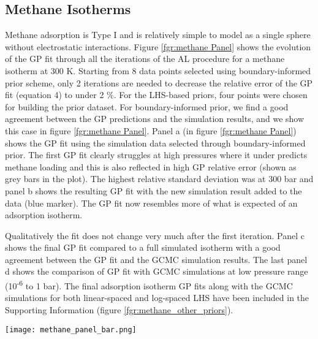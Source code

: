 \documentclass[twoside,twocolumn,9pt]{article}
\begin{document}
\subsection{Methane Isotherms}
Methane adsorption is Type I and is relatively simple to model as a single sphere without electrostatic interactions. Figure \ref{fgr:methane Panel} shows the evolution of the GP fit through all the iterations of the AL procedure for a methane isotherm at 300 K. Starting from 8 data points selected using boundary-informed prior scheme, only 2 iterations are needed to decrease the relative error of the GP fit (equation 4) to under 2 \%. For the LHS-based priors, four points were chosen for building the prior dataset. For boundary-informed prior, we find a good agreement between the GP predictions and the simulation results, and we show this case in figure \ref{fgr:methane Panel}. Panel a (in figure \ref{fgr:methane Panel}) shows the GP fit using the simulation data selected through boundary-informed prior. The first GP fit clearly struggles at high pressures where it under predicts methane loading and this is also reflected in high GP relative error (shown as grey bars in the plot). The highest relative standard deviation was at 300 bar and panel b shows the resulting GP fit with the new simulation result added to the data (blue marker). The GP fit now resembles more of what is expected of an adsorption isotherm.

Qualitatively the fit does not change very much after the first iteration. Panel c shows the final GP fit compared to a full simulated isotherm with a good agreement between the GP fit and the GCMC simulation results. The last panel d shows the comparison of GP fit with GCMC simulations at low pressure range (10\textsuperscript{-6} to 1 bar). The final adsorption isotherm GP fits along with the GCMC simulations for both linear-spaced and log-spaced LHS have been included in the Supporting Information (figure \ref{fgr:methane_other_priors}). 

\begin{figure*}
\centering
  \texttt{[image: methane\_panel\_bar.png]}
  \caption{Evolution of GP fit to GCMC simulations of a methane isotherm at 300 K. Line in red represents the GP fit. Panel a shows the GP fit to the data resulting from boundary-informed prior selection.  Boundary-informed prior points are shown in black diamonds. Panels a-b show the subsequent iterations and the new simulation added to the data to be fit is shown in blue marker. Panel c shows the final GP fit along with results from GCMC simulations (ground truth) for a full methane isotherm. Panel d shows the GP fit along with GCMC simulations for the pressure range of 10\textsuperscript{-6} to 1 bar}
  \label{fgr:methane Panel}
\end{figure*}
\end{document}
